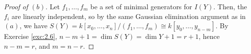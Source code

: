 \documentclass[12pt,letterpaper]{article}
\theoremstyle{definition}
\theoremstyle{remark}
\numberwithin{equation}{section}
\numberwithin{figure}{problem}
\newcommand{\PP}{\mathbb{P}}
\begin{document}
\begin{proof}[Proof of $(b)$]
  Let $f_1,\ldots,f_m$ be a set of minimal generators for $I(Y)$. Then, the $f_i$ are
  linearly independent, so by the same Gaussian elimination argument as in
  $(a)$, we have $S(Y) = k[x_0,\ldots,x_n]/(f_1,\ldots,f_m) \cong
  k[y_0,\ldots,y_{n-m}]$. By Exercise \ref{exc:2.6}, $n - m + 1 = \dim S(Y) =
  \dim Y + 1 = r + 1$, hence $n-m = r$, and $m = n-r$.
\end{proof}
\end{document}
